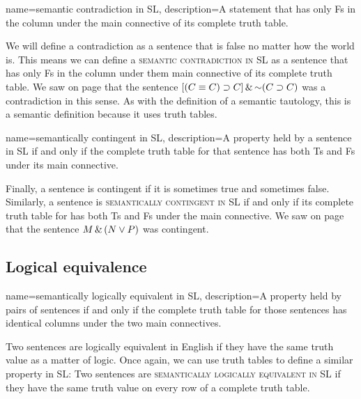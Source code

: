{
name=semantic contradiction in SL,
description={A statement that has only Fs in the column under the main connective of its complete truth table.}
}

We will define a contradiction as a sentence that is false no matter how the world is. This means we can define a \textsc{\gls{semantic contradiction in SL}} \label{def:semantic_contradiction_in_sl} as a sentence that has only Fs in the column under them main connective of its complete truth table. We saw on page \pageref{contradiction3.1} that the sentence $[(C\equiv C) \supset C] \,\&\, \mathord{\sim}(C \supset C)$ was a contradiction in this sense. As with the definition of a semantic tautology, this is a semantic definition because it uses truth tables. 
		
{
name=semantically contingent in SL,
description={A property held by a sentence in SL if and only if the complete truth table for that sentence has both Ts and Fs under its main connective.}
}

Finally, a sentence is contingent if it is sometimes true and sometimes false. Similarly, a sentence is \textsc{\gls{semantically contingent in SL}} \label{def:semantically_contingent_in_sl} if and only if its complete truth table for has both Ts and Fs under the main connective. We saw on page \pageref{contingentsentence3.1} that the sentence $M \,\&\, (N \vee P)$ was contingent.

\subsection{Logical equivalence}

{
name=semantically logically equivalent in SL,
description={A property held by pairs of sentences if and only if the complete truth table for those sentences has identical columns under the two main connectives.}
}

Two sentences are logically equivalent in English if they have the same truth value as a matter of logic. Once again, we can use truth tables to define a similar property in SL: Two sentences are \textsc{\gls{semantically logically equivalent in SL}} \label{def:semantically_logically_equivalent_in_sl} if they have the same truth value on every row of a complete truth table.

